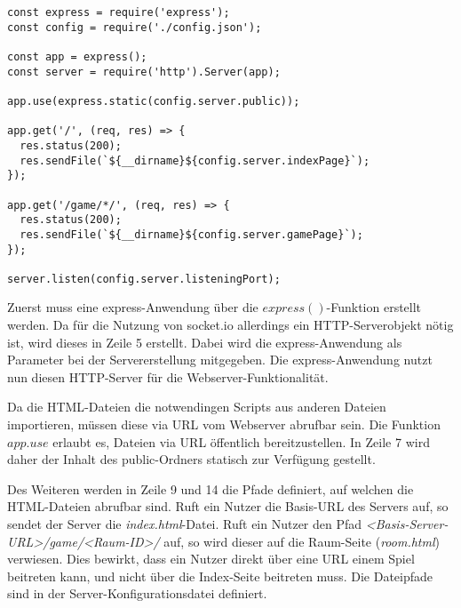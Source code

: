 \vspace{11pt}
\lstset{language=js, style=STYLE_CODE_JS}
\begin{minipage}{\textwidth}
\begin{singlespace}
\begin{lstlisting}[caption={express Server -- Server.js}, captionpos=b, label={lst:express}]
const express = require('express');
const config = require('./config.json');

const app = express();
const server = require('http').Server(app);

app.use(express.static(config.server.public));

app.get('/', (req, res) => {
  res.status(200);
  res.sendFile(`${__dirname}${config.server.indexPage}`);
});

app.get('/game/*/', (req, res) => {
  res.status(200);
  res.sendFile(`${__dirname}${config.server.gamePage}`);
});

server.listen(config.server.listeningPort);
\end{lstlisting}
\end{singlespace}
\end{minipage}

Zuerst muss eine express-Anwendung über die $express()$-Funktion erstellt werden. Da für die Nutzung von socket.io allerdings ein \acs{HTTP}-Serverobjekt nötig ist, wird dieses in Zeile 5 erstellt. Dabei wird die express-Anwendung als Parameter bei der Servererstellung mitgegeben. Die express-Anwendung nutzt nun diesen \acs{HTTP}-Server für die Webserver-Funktionalität.\par

Da die \acs{HTML}-Dateien die notwendingen Scripts aus anderen Dateien importieren, müssen diese via \acs{URL} vom Webserver abrufbar sein. Die Funktion $app.use$ erlaubt es, Dateien via \acs{URL} öffentlich bereitzustellen. In Zeile 7 wird daher der Inhalt des \glqq{}public\grqq{}-Ordners statisch zur Verfügung gestellt.\par

Des Weiteren werden in Zeile 9 und 14 die Pfade definiert, auf welchen die \acs{HTML}-Dateien abrufbar sind. Ruft ein Nutzer die Basis-\acs{URL} des Servers auf, so sendet der Server die \textit{index.html}-Datei. Ruft ein Nutzer den Pfad \textit{<Basis-Server-URL>/game/<Raum-ID>/} auf, so wird dieser auf die Raum-Seite (\textit{room.html}) verwiesen. Dies bewirkt, dass ein Nutzer direkt über eine \acs{URL} einem Spiel beitreten kann, und nicht über die Index-Seite beitreten muss. Die Dateipfade sind in der Server-Konfigurationsdatei definiert.

